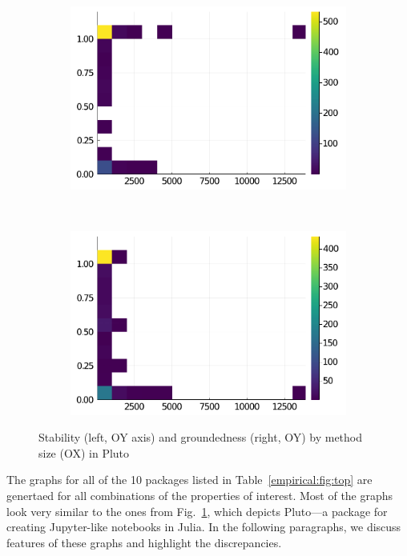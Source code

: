 \begin{figure}[h]
\centering
     \begin{subfigure}[b]{0.35\textwidth}
       \includegraphics[width=\textwidth]{figs/Pluto-size-vs-stable.pdf}
     \end{subfigure}
     \ \ \
     \begin{subfigure}[b]{0.35\textwidth}
       \includegraphics[width=\textwidth]{figs/Pluto-size-vs-grounded.pdf}
     \end{subfigure}
\caption{Stability (left, OY axis) and groundedness (right, OY) by method size (OX) in Pluto}%
\label{figs:size:Pluto:main}
\end{figure}

The graphs for all of the 10 packages listed in
Table~\ref{empirical:fig:top} are genertaed for all combinations of the properties of
interest.
Most of the graphs look very similar to the ones from
Fig.~\ref{figs:size:Pluto:main}, which depicts Pluto---a package for creating
Jupyter-\hspace{0pt}like notebooks in Julia. In the following paragraphs, we
discuss features of these graphs and highlight the discrepancies.

